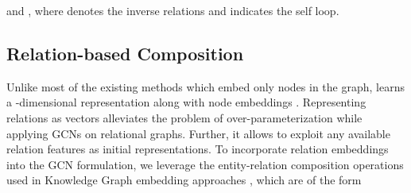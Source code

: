 \documentclass{article} \usepackage{iclr2020_conference,times}
\begin{document}
and , where  denotes the inverse relations and  indicates the self loop.


\begin{table*}[t]
	\centering
	
	\caption{\label{tbl:gcn_model_comp}Comparison of our proposed method, \method{} with other Graph Convolutional methods. Here,  denotes the number of layers in the model,  is the embedding dimension,  represents the number of bases and  indicates the total number of relations in the graph. Overall, \method{} is most comprehensive and is more parameter efficient than methods which encode relation and direction information.}
\end{table*}


\subsection{Relation-based Composition}
\label{sec:details_relation}
Unlike most of the existing methods which embed only nodes in the graph, \method{} learns a -dimensional representation  along with node embeddings . Representing relations as vectors alleviates the problem of over-parameterization while applying GCNs on relational graphs. Further, it allows \method{} to exploit any available relation features  as initial representations. To incorporate relation embeddings into the GCN formulation, we leverage the entity-relation composition operations used in Knowledge Graph embedding approaches \citep{transe,survey2016nickel}, which are of the form
\end{document}
